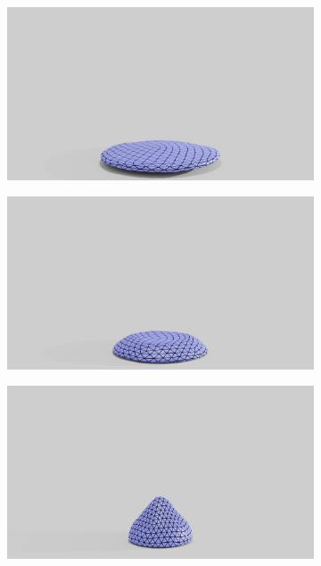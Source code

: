 \begin{figure}[htp!]
\begin{subfigure}{.16\linewidth}
	\end{subfigure}%
	\begin{subfigure}{.16\linewidth}
		\centering
		{\includegraphics[width=2.0\textwidth]{images/coarse_ball/vp/0300.jpg}}
		\label{sfig:ball-vc-3}
	\end{subfigure}%
	\begin{subfigure}{.16\linewidth}
		\centering
		{\includegraphics[width=2.0\textwidth]{images/coarse_ball/vp/0350.jpg}}
		\label{sfig:ball-vc-4}
	\end{subfigure}%
	\begin{subfigure}{.16\linewidth}
		\centering
		{\includegraphics[width=2.0\textwidth]{images/coarse_ball/vp/0400.jpg}}

\end{subfigure}
\end{figure}
